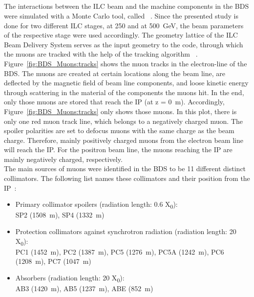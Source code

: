 \subsection{\mucarlo}
\label{BDS_Muons:MUCARLO}
The interactions between the ILC beam and the machine components in the BDS were simulated with a Monte Carlo tool, called \mucarlo~\cite{Mucarlo,MuonBkg_05TeV,MuonBkg_1TeV}.
Since the presented study is done for two different ILC stages, at 250 and at \SI{500}{\GeV}, the beam parameters of the respective stage were used accordingly.
The geometry lattice of the ILC Beam Delivery System serves as the input geometry to the \mucarlo code, through which the muons are tracked with the help of the tracking algorithm \turtle~\cite{Turtle}.
Figure~\ref{fig:BDS_Muons:tracks} shows the muon tracks in the electron-line of the BDS.
The muons are created at certain locations along the beam line, are deflected by the magnetic field of beam line components, and loose kinetic energy through scattering in the material of the components the muons hit.
In the end, only those muons are stored that reach the IP (at z = \SI{0}{\meter}).
Accordingly, Figure~\ref{fig:BDS_Muons:tracks} only shows those muons.
In this plot, there is only one red muon track line, which belongs to a negatively charged muon.
The spoiler polarities are set to defocus muons with the same charge as the beam charge.
Therefore, mainly positively charged muons from the electron beam line will reach the IP.
For the positron beam line, the muons reaching the IP are mainly negatively charged, respectively.
\\The main sources of muons were identified in the BDS to be 11 different distinct collimators.
The following list names these collimators and their position from the IP~\cite{Lewis}:
\begin{itemize}
 \item Primary collimator spoilers (radiation length: 0.6 X\textsubscript{0}):\\
  SP2 (\SI{1508}{\meter}), SP4 (\SI{1332}{\meter})
 \item Protection collimators against synchrotron radiation (radiation length: 20 X\textsubscript{0}):\\
  PC1 (\SI{1452}{\meter}), PC2 (\SI{1387}{\meter}), PC5 (\SI{1276}{\meter}), PC5A (\SI{1242}{\meter}), PC6 (\SI{1208}{\meter}), PC7 (\SI{1047}{\meter})
 \item Absorbers (radiation length: 20 X\textsubscript{0}):\\ 
  AB3 (\SI{1420}{\meter}), AB5 (\SI{1237}{\meter}), ABE (\SI{852}{\meter})
\end{itemize}
